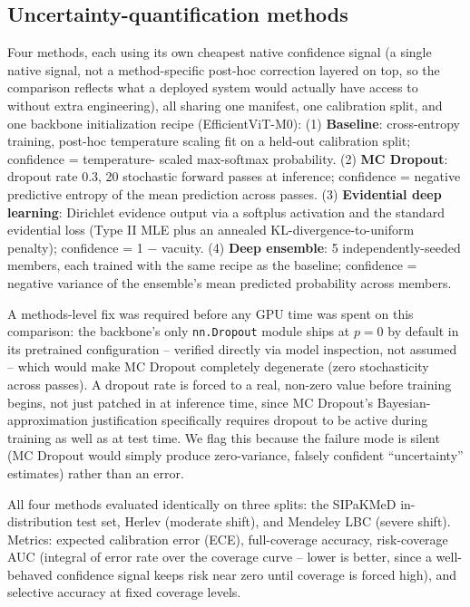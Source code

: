 \documentclass[runningheads]{llncs}
\begin{document}
\subsection{Uncertainty-quantification methods}

Four methods, each using its own cheapest native confidence signal (a
single native signal, not a method-specific post-hoc correction layered
on top, so the comparison reflects what a deployed system would actually
have access to without extra engineering), all sharing one manifest, one
calibration split, and one backbone initialization recipe (EfficientViT-M0):
(1) \textbf{Baseline}: cross-entropy training, post-hoc temperature
scaling fit on a held-out calibration split; confidence = temperature-
scaled max-softmax probability. (2) \textbf{MC Dropout}: dropout rate
0.3, 20 stochastic forward passes at inference; confidence = negative
predictive entropy of the mean prediction across passes. (3)
\textbf{Evidential deep learning}: Dirichlet evidence output via a
softplus activation and the standard evidential loss (Type II MLE plus an
annealed KL-divergence-to-uniform penalty); confidence = 1 $-$ vacuity.
(4) \textbf{Deep ensemble}: 5 independently-seeded members, each trained
with the same recipe as the baseline; confidence = negative variance of
the ensemble's mean predicted probability across members.

A methods-level fix was required before any GPU time was spent on this
comparison: the backbone's only \texttt{nn.Dropout} module ships at $p=0$
by default in its pretrained configuration -- verified directly via model
inspection, not assumed -- which would make MC Dropout completely
degenerate (zero stochasticity across passes). A dropout rate is forced
to a real, non-zero value before training begins, not just patched in at
inference time, since MC Dropout's Bayesian-approximation justification
specifically requires dropout to be active during training as well as at
test time. We flag this because the failure mode is silent (MC Dropout
would simply produce zero-variance, falsely confident ``uncertainty''
estimates) rather than an error.

All four methods evaluated identically on three splits: the SIPaKMeD
in-distribution test set, Herlev (moderate shift), and Mendeley LBC
(severe shift). Metrics: expected calibration error (ECE), full-coverage
accuracy, risk-coverage AUC (integral of error rate over the coverage
curve -- lower is better, since a well-behaved confidence signal keeps
risk near zero until coverage is forced high), and selective accuracy at
fixed coverage levels.
\end{document}
